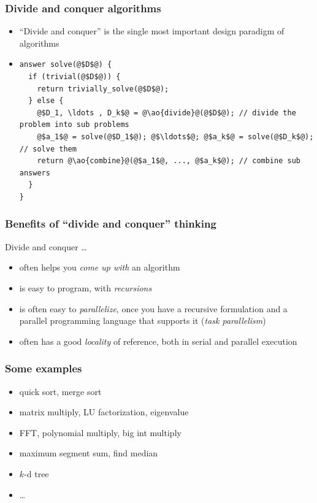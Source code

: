 \documentclass[12pt,dvipdfmx]{beamer}
\newcommand{\ao}[1]{{\color{blue}#1}}
\begin{document}
\begin{frame}[fragile]
\frametitle{Divide and conquer algorithms}
\begin{itemize}
\item ``Divide and conquer'' is the single
  most important design paradigm of algorithms
\item []
\begin{lstlisting}[basicstyle=\scriptsize]
answer solve(@$D$@) {
  if (trivial(@$D$@)) {
    return trivially_solve(@$D$@);
  } else {
    @$D_1, \ldots , D_k$@ = @\ao{divide}@(@$D$@); // divide the problem into sub problems
    @$a_1$@ = solve(@$D_1$@); @$\ldots$@; @$a_k$@ = solve(@$D_k$@); // solve them
    return @\ao{combine}@(@$a_1$@, ..., @$a_k$@); // combine sub answers
  }
}
\end{lstlisting}
\end{itemize}

\def\svgwidth{\textwidth}
{\tiny}

\end{frame}

\begin{frame}
\frametitle{Benefits of ``divide and conquer'' thinking}
Divide and conquer \ldots
\begin{itemize}
\item often helps you \ao{\em come up with} an algorithm

\item is easy to program, with \ao{\em recursions}

\item is often easy to \ao{\em parallelize}, once
  you have a recursive formulation
  and a parallel programming language that
  supports it (\ao{\em task parallelism})

\item often has a good \ao{\em locality} of
  reference, both in serial and parallel execution
\end{itemize}
\end{frame}


\begin{frame}
\frametitle{Some examples}
\begin{itemize}
\item quick sort, merge sort
\item matrix multiply, LU factorization, eigenvalue
\item FFT, polynomial multiply, big int multiply
\item maximum segment sum, find median 
\item $k$-d tree
\item \ldots
\end{itemize}
\end{frame}
\end{document}
